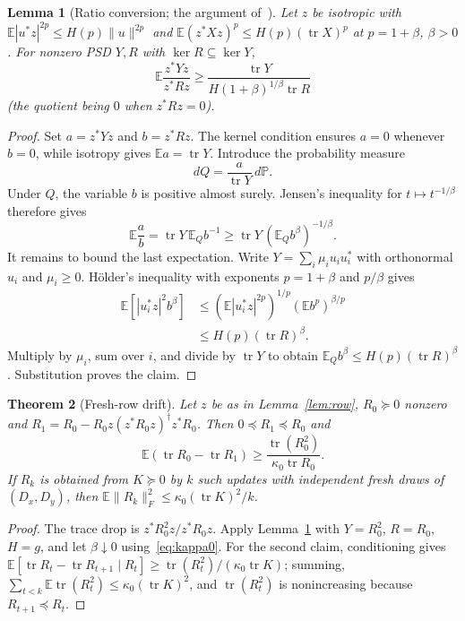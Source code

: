 \documentclass[11pt,a4paper]{article}
\newtheorem{theorem}{Theorem}[section]
\newtheorem{lemma}[theorem]{Lemma}
\theoremstyle{definition}
\theoremstyle{remark}
\numberwithin{equation}{section}
\newcommand{\E}{\mathbb E}
\newcommand{\Prob}{\mathbb P}
\newcommand{\tr}{\operatorname{tr}}
\newcommand{\norm}[1]{\lVert#1\rVert}
\begin{document}
\begin{lemma}[Ratio conversion; the argument of~\cite{PP}]\label{lem:ratio}
Let $z$ be isotropic with $\E|u^*z|^{2p}\le H(p)\norm u^{2p}$ and
$\E(z^*Xz)^p\le H(p)(\tr X)^p$ at $p=1+\beta$, $\beta>0$. For nonzero PSD
$Y,R$ with $\ker R\subseteq\ker Y$,
\[
 \E\frac{z^*Yz}{z^*Rz}\ge\frac{\tr Y}{H(1+\beta)^{1/\beta}\tr R}
\]
(the quotient being $0$ when $z^*Rz=0$).
\end{lemma}
\begin{proof}

Set $a=z^*Yz$ and $b=z^*Rz$. The kernel condition ensures $a=0$ whenever
$b=0$, while isotropy gives $\E a=\tr Y$. Introduce the probability measure
\[
 dQ=\frac{a}{\tr Y}\,d\Prob.
\]
Under $Q$, the variable $b$ is positive almost surely. Jensen's inequality
for $t\mapsto t^{-1/\beta}$ therefore gives
\[
 \E\frac ab=\tr Y\,\E_Qb^{-1}
 \ge\tr Y\,(\E_Qb^\beta)^{-1/\beta}.
\]
It remains to bound the last expectation. Write
$Y=\sum_i\mu_iu_iu_i^*$ with orthonormal $u_i$ and $\mu_i\ge0$.
H\"older's inequality with exponents $p=1+\beta$ and $p/\beta$ gives
\begin{align*}
 \E[|u_i^*z|^2b^\beta]
 &\le(\E|u_i^*z|^{2p})^{1/p}(\E b^p)^{\beta/p}\\
 &\le H(p)(\tr R)^\beta.
\end{align*}
Multiply by $\mu_i$, sum over $i$, and divide by $\tr Y$ to obtain
$\E_Qb^\beta\le H(p)(\tr R)^\beta$. Substitution proves the claim.

\end{proof}

\begin{theorem}[Fresh-row drift]\label{thm:drift}
Let $z$ be as in Lemma~\ref{lem:row}, $R_0\succeq0$ nonzero and
$R_1=R_0-R_0z(z^*R_0z)^\dagger z^*R_0$. Then $0\preceq R_1\preceq R_0$ and
\[
 \E(\tr R_0-\tr R_1)\ge\frac{\tr(R_0^2)}{\kappa_0\tr R_0}.
\]
If $R_k$ is obtained from $K\succeq0$ by $k$ such updates with independent fresh
draws of $(D_x,D_y)$, then $\E\norm{R_k}_F^2\le\kappa_0(\tr K)^2/k$.
\end{theorem}
\begin{proof}
The trace drop is $z^*R_0^2z/z^*R_0z$. Apply Lemma~\ref{lem:ratio} with
$Y=R_0^2$, $R=R_0$, $H=g$, and let $\beta\downarrow0$ using~\eqref{eq:kappa0}.
For the second claim, conditioning gives
$\E[\tr R_t-\tr R_{t+1}\mid R_t]\ge\tr(R_t^2)/(\kappa_0\tr K)$; summing,
$\sum_{t<k}\E\tr(R_t^2)\le\kappa_0(\tr K)^2$, and $\tr(R_t^2)$ is nonincreasing
because $R_{t+1}\preceq R_t$.
\end{proof}
\end{document}
